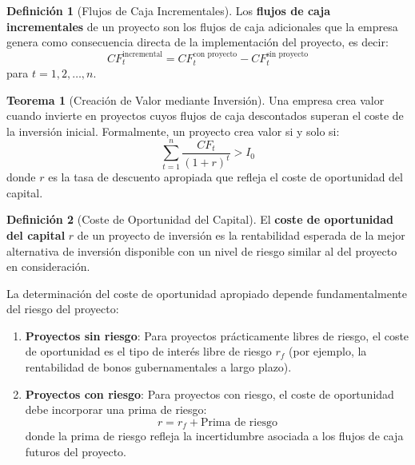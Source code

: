 \documentclass[12pt,a4paper]{article}
\theoremstyle{definition}
\newtheorem{definicion}{Definición}[section]
\newtheorem{teorema}{Teorema}[section]
\begin{document}
\begin{definicion}[Flujos de Caja Incrementales]
Los \textbf{flujos de caja incrementales} de un proyecto son los flujos de caja adicionales que la empresa genera como consecuencia directa de la implementación del proyecto, es decir:
\begin{equation}
CF_t^{\text{incremental}} = CF_t^{\text{con proyecto}} - CF_t^{\text{sin proyecto}}
\end{equation}
para $t = 1, 2, \ldots, n$.
\end{definicion}

\begin{center}
    
\end{center}

\begin{teorema}[Creación de Valor mediante Inversión]
Una empresa crea valor cuando invierte en proyectos cuyos flujos de caja descontados superan el coste de la inversión inicial. Formalmente, un proyecto crea valor si y solo si:
\begin{equation}
\sum_{t=1}^{n} \frac{CF_t}{(1+r)^t} > I_0
\end{equation}
donde $r$ es la tasa de descuento apropiada que refleja el coste de oportunidad del capital.
\end{teorema}

\begin{definicion}[Coste de Oportunidad del Capital]
El \textbf{coste de oportunidad del capital} $r$ de un proyecto de inversión es la rentabilidad esperada de la mejor alternativa de inversión disponible con un nivel de riesgo similar al del proyecto en consideración.
\end{definicion}

La determinación del coste de oportunidad apropiado depende fundamentalmente del riesgo del proyecto:

\begin{enumerate}
\item \textbf{Proyectos sin riesgo}: Para proyectos prácticamente libres de riesgo, el coste de oportunidad es el tipo de interés libre de riesgo $r_f$ (por ejemplo, la rentabilidad de bonos gubernamentales a largo plazo).

\item \textbf{Proyectos con riesgo}: Para proyectos con riesgo, el coste de oportunidad debe incorporar una prima de riesgo:
\begin{equation}
r = r_f + \text{Prima de riesgo}
\end{equation}
donde la prima de riesgo refleja la incertidumbre asociada a los flujos de caja futuros del proyecto.
\end{enumerate}
\end{document}
